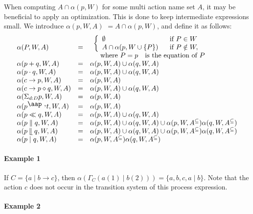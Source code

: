 \documentclass{article}
\begin{document}
When computing $A\cap \alpha (p,W)$ for some multi action name set $A$, it
may be beneficial to apply an optimization. This is done to keep
intermediate expressions small. We introduce $\alpha (p,W,A)$ $=A\cap \alpha
(p,W)$, and define it as follows:%
\[
\begin{array}{lll}
\alpha (P,W,A) & = & 
\begin{array}{l}
\left\{ 
\begin{array}{ll}
\emptyset & \text{if }P\in W \\ 
A\cap \alpha (p,W\cup \{P\}) & \text{if }P\notin W,%
\end{array}%
\right. \\ 
\text{ where }P=p\text{ is the equation of }P%
\end{array}
\\ 
\alpha (p+q,W,A) & = & \alpha (p,W,A)\cup \alpha (q,W,A) \\ 
\alpha (p\cdot q,W,A) & = & \alpha (p,W,A)\cup \alpha (q,W,A) \\ 
\alpha (c\rightarrow p,W,A) & = & \alpha (p,W,A) \\ 
\alpha (c\rightarrow p\diamond q,W,A) & = & \alpha (p,W,A)\cup \alpha (q,W,A)
\\ 
\alpha (\Sigma _{d:D}p,W,A) & = & \alpha (p,W,A) \\ 
\alpha (p^{\mathbin{\mbox{\aap
,}}}t,W,A) & = & \alpha (p,W,A) \\ 
\alpha (p\ll q,W,A) & = & \alpha (p,W,A)\cup \alpha (q,W,A) \\ 
\alpha (p\parallel q,W,A) & = & \alpha (p,W,A)\cup \alpha (q,W,A)\cup \alpha
(p,W,A^{\subseteq })\alpha (q,W,A^{\subseteq }) \\ 
\alpha (p\mathbin{\mathrel{\llfloor}}q,W,A) & = & \alpha (p,W,A)\cup \alpha
(q,W,A)\cup \alpha (p,W,A^{\subseteq })\alpha (q,W,A^{\subseteq }) \\ 
\alpha (p\mid q,W,A) & = & \alpha (p,W,A^{\subseteq })\alpha
(q,W,A^{\subseteq })%
\end{array}%
\]

\paragraph{Example 1}

If $C=\{a\mid b\rightarrow c\}$, then $\alpha (\Gamma _{C}(a(1)\mid
b(2)))=\{a,b,c,a\mid b\}$. Note that the action $c$ does not occur in the
transition system of this process expression.

\paragraph{Example 2}
\end{document}
